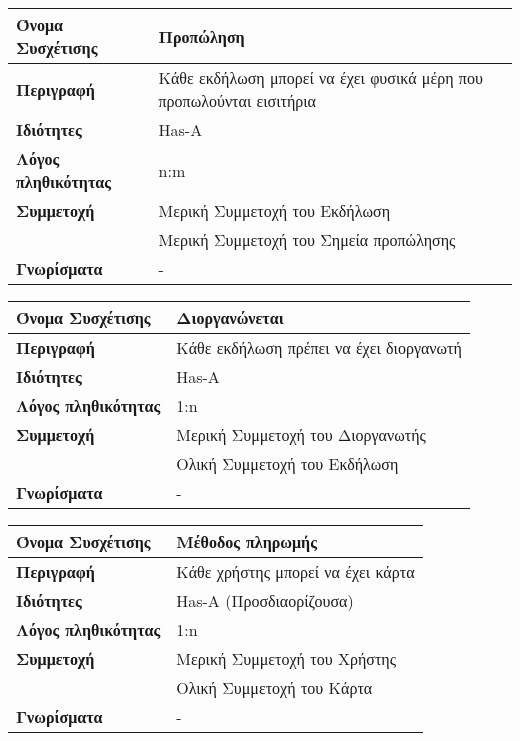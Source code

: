\begin{center}
\begin{tabular}[]{|p{4cm}|p{10cm}|}
  \hline
  \textbf{Όνομα Συσχέτισης} & Προπώληση \\ \hline
  \textbf{Περιγραφή} & Κάθε εκδήλωση μπορεί να έχει φυσικά μέρη που προπωλούνται εισιτήρια\\ \hline
  \textbf{Ιδιότητες} & Has-A \\ \hline
  \textbf{Λόγος πληθικότητας} & n:m \\ \hline
  \textbf{Συμμετοχή} & Μερική Συμμετοχή του Εκδήλωση \\ \cline{2-2}
                     & Μερική Συμμετοχή του Σημεία προπώλησης\\ \hline
  \textbf{Γνωρίσματα} & - \\ \hline
\end{tabular}
\vspace{0.3 cm}


\begin{tabular}[]{|p{4cm}|p{10cm}|}
  \hline
  \textbf{Όνομα Συσχέτισης} & Διοργανώνεται\\  \hline
  \textbf{Περιγραφή} & Κάθε εκδήλωση πρέπει να έχει διοργανωτή\\ \hline
  \textbf{Ιδιότητες} & Has-A \\ \hline
  \textbf{Λόγος πληθικότητας} & 1:n \\ \hline
  \textbf{Συμμετοχή} & Mερική Συμμετοχή του Διοργανωτής \\ \cline{2-2}
                     & Ολική Συμμετοχή του Εκδήλωση \\ \hline
  \textbf{Γνωρίσματα} & - \\ \hline
\end{tabular}
\vspace{0.3 cm}

\begin{tabular}[]{|p{4cm}|p{10cm}|}
  \hline
  \textbf{Όνομα Συσχέτισης} & Μέθοδος πληρωμής\\  \hline
  \textbf{Περιγραφή} & Κάθε χρήστης μπορεί να έχει κάρτα\\ \hline
  \textbf{Ιδιότητες} & Has-A (Προσδιαορίζουσα) \\ \hline
  \textbf{Λόγος πληθικότητας} & 1:n \\ \hline
  \textbf{Συμμετοχή} & Mερική Συμμετοχή του Χρήστης \\ \cline{2-2}
                     & Ολική Συμμετοχή του Κάρτα \\ \hline
  \textbf{Γνωρίσματα} & - \\ \hline
\end{tabular}
\vspace{0.3 cm}



\end{center}
